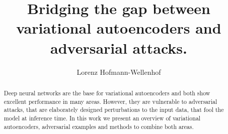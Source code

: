 \documentclass[sigconf]{acmart}
\begin{document}
\title{Bridging the gap between variational autoencoders and adversarial attacks.}

\author{Lorenz Hofmann-Wellenhof}

\begin{abstract}
  Deep neural networks are the base for variational autoencoders and both show
  excellent performance in many areas. However, they are vulnerable to
  adversarial attacks, that are elaborately designed perturbations to the input
  data, that fool the model at inference time. In this work we present an
  overview of variational autoencoders, adversarial examples and methods to
  combine both areas.
\end{abstract}



\maketitle










 




\end{document}

